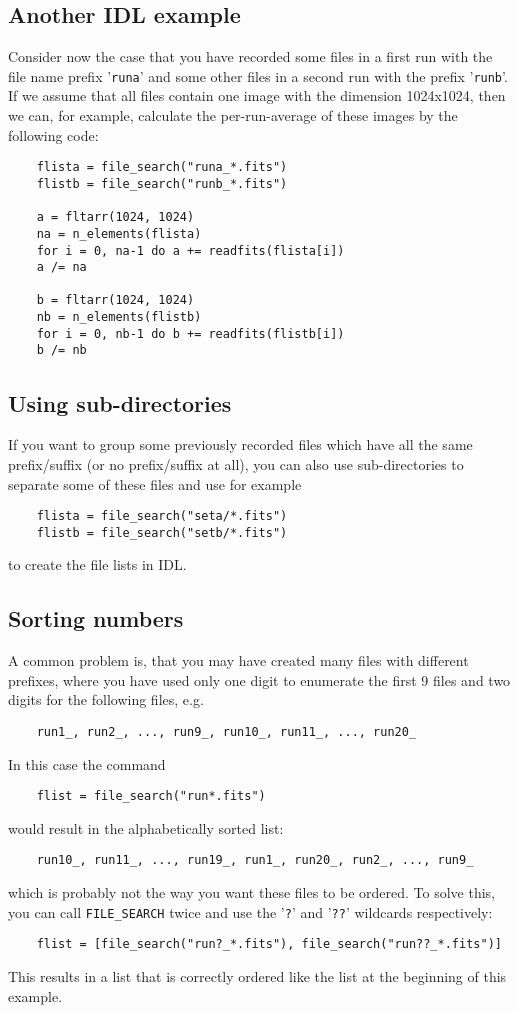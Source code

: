 \documentclass[11pt, a4paper]{scrartcl}
\begin{document}
\subsection{Another IDL example}
Consider now the case that you have recorded some files in a first run with the file name prefix '\texttt{runa}' and some other files in a second run with the prefix '\texttt{runb}'. If we assume that all files contain one image with the dimension 1024x1024, then we can, for example, calculate the per-run-average of these images by the following code:
\begin{verbatim}
    flista = file_search("runa_*.fits")
    flistb = file_search("runb_*.fits")
    
    a = fltarr(1024, 1024)
    na = n_elements(flista)
    for i = 0, na-1 do a += readfits(flista[i])
    a /= na
    
    b = fltarr(1024, 1024)
    nb = n_elements(flistb)
    for i = 0, nb-1 do b += readfits(flistb[i])
    b /= nb
\end{verbatim}

\subsection{Using sub-directories}
If you want to group some previously recorded files which have all the same prefix/suffix (or no prefix/suffix at all), you can also use sub-directories to separate some of these files and use for example
\begin{verbatim}
    flista = file_search("seta/*.fits")
    flistb = file_search("setb/*.fits")
\end{verbatim}
to create the file lists in IDL.


\subsection{Sorting numbers}
A common problem is, that you may have created many files with different prefixes, where you have used only one digit to enumerate the first 9 files and two digits for the following files, e.g.
\begin{verbatim}
    run1_, run2_, ..., run9_, run10_, run11_, ..., run20_
\end{verbatim}
In this case the command
\begin{verbatim}
    flist = file_search("run*.fits")
\end{verbatim}
would result in the alphabetically sorted list:
\begin{verbatim}
    run10_, run11_, ..., run19_, run1_, run20_, run2_, ..., run9_
\end{verbatim}
which is probably not the way you want these files to be ordered. To solve this, you can call \texttt{FILE\_SEARCH} twice and use the '\texttt{?}' and '\texttt{??}' wildcards respectively:
\begin{verbatim}
    flist = [file_search("run?_*.fits"), file_search("run??_*.fits")]
\end{verbatim}
This results in a list that is correctly ordered like the list at the beginning of this example.
\end{document}

